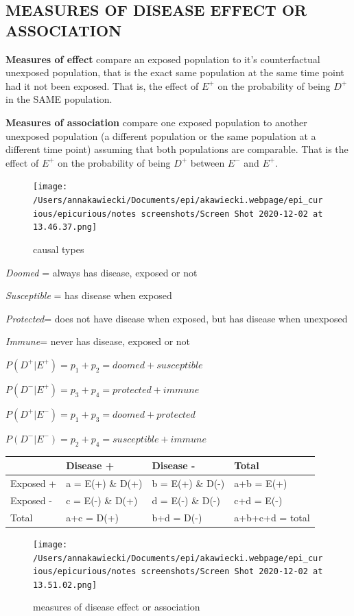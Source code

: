 \documentclass[
]{article}
\begin{document}
\hypertarget{measures-of-disease-effect-or-association}{%
\subsection{MEASURES OF DISEASE EFFECT OR
ASSOCIATION}\label{measures-of-disease-effect-or-association}}

\textbf{Measures of effect} compare an exposed population to it's
counterfactual unexposed population, that is the exact same population
at the same time point had it not been exposed. That is, the effect of
\(E^+\) on the probability of being \(D^+\) in the SAME population.

\textbf{Measures of association} compare one exposed population to
another unexposed population (a different population or the same
population at a different time point) assuming that both populations are
comparable. That is the effect of \(E^+\) on the probability of being
\(D^+\) between \(E^-\) and \(E^+\).

\begin{figure}
\centering
\texttt{[image: /Users/annakawiecki/Documents/epi/akawiecki.webpage/epi\_curious/epicurious/notes screenshots/Screen Shot 2020-12-02 at 13.46.37.png]}
\caption{causal types}
\end{figure}

\emph{Doomed} = always has disease, exposed or not

\emph{Susceptible} = has disease when exposed

\emph{Protected}= does not have disease when exposed, but has disease
when unexposed

\emph{Immune}= never has disease, exposed or not

\(P(D^+|E^+) = p_1 + p_2 = doomed + susceptible\)

\(P(D^-|E^+) = p_3 + p_4 = protected + immune\)

\(P(D^+|E^-) = p_1 + p_3 = doomed + protected\)

\(P(D^-|E^-) = p_2 + p_4 = susceptible + immune\)

\begin{longtable}[]{@{}llll@{}}
\toprule
& Disease + & Disease - & Total\tabularnewline
\midrule
\endhead
Exposed + & a = E(+) \& D(+) & b = E(+) \& D(-) & a+b =
E(+)\tabularnewline
Exposed - & c = E(-) \& D(+) & d = E(-) \& D(-) & c+d =
E(-)\tabularnewline
Total & a+c = D(+) & b+d = D(-) & a+b+c+d = total\tabularnewline
\bottomrule
\end{longtable}

\begin{figure}
\centering
\texttt{[image: /Users/annakawiecki/Documents/epi/akawiecki.webpage/epi\_curious/epicurious/notes screenshots/Screen Shot 2020-12-02 at 13.51.02.png]}
\caption{measures of disease effect or association}
\end{figure}
\end{document}
